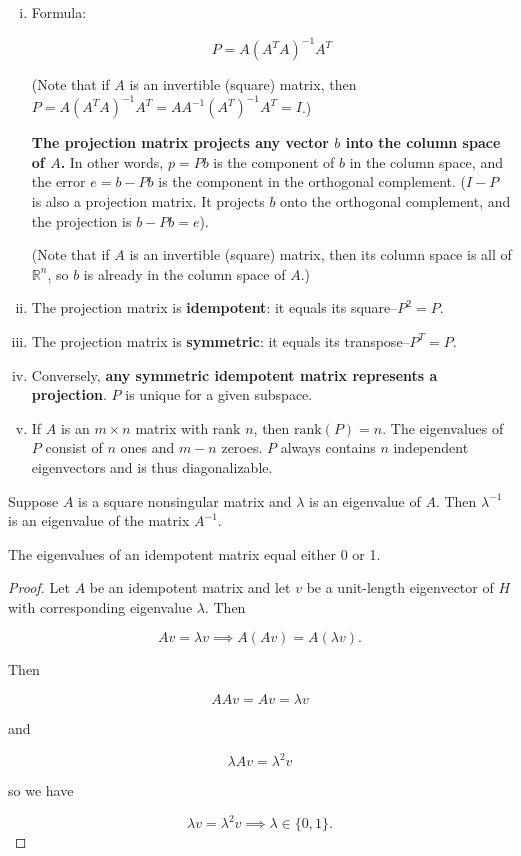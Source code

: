 \begin{enumerate}[i.]

\item Formula:

\[
P = A(A^TA)^{-1}A^T
\]

(Note that if \(A\) is an invertible (square) matrix, then \(P = A(A^TA)^{-1}A^T = AA^{-1}(A^T)^{-1}A^T = I\).)

\textbf{The projection matrix projects any vector \(b\) into the column space of \(A\).} In other words, \(p = Pb\) is the component of \(b\) in the column space, and the error \(e = b - Pb\) is the component in the orthogonal complement. (\(I - P\) is also a projection matrix. It projects \(b\) onto the orthogonal complement, and the projection is \(b - Pb = e\)).

(Note that if \(A\) is an invertible (square) matrix, then its column space is all of \(\mathbb{R}^n\), so \(b\) is already in the column space of \(A\).)

\item The projection matrix is \textbf{idempotent}: it equals its square--\(P^2 = P\).

\item The projection matrix is \textbf{symmetric}: it equals its transpose--\(P^T = P\).

\item Conversely, \textbf{any symmetric idempotent matrix represents a projection}. \(P\) is unique for a given subspace.

\item If \(A\) is an \(m \times n\) matrix with rank \(n\), then \(\text{rank} (P) = n\). The eigenvalues of \(P\) consist of \(n\) ones and \(m - n\) zeroes. \(P\) always contains \(n\) independent eigenvectors and is thus diagonalizable. 

\end{enumerate}

Suppose \(A\) is a square nonsingular matrix and \(\lambda\) is an eigenvalue of \(A\). Then \(\lambda^{-1}\) is an eigenvalue of the matrix \(A^{-1}\).

\begin{proposition}

The eigenvalues of an idempotent matrix equal either 0 or 1.

\end{proposition}

\begin{proof}

Let \(A\) be an idempotent matrix and let \(v\) be a unit-length eigenvector of \(H\) with corresponding eigenvalue \(\lambda\). Then

\[
Av = \lambda v \implies A (Av) = A (\lambda v) .
\]

Then

\[
AAv = Av = \lambda v
\]

and

\[
\lambda A v = \lambda^2 v
\]

so we have

\[
\lambda v = \lambda^2 v \implies \lambda \in \{0, 1\}.
\]

\end{proof}

